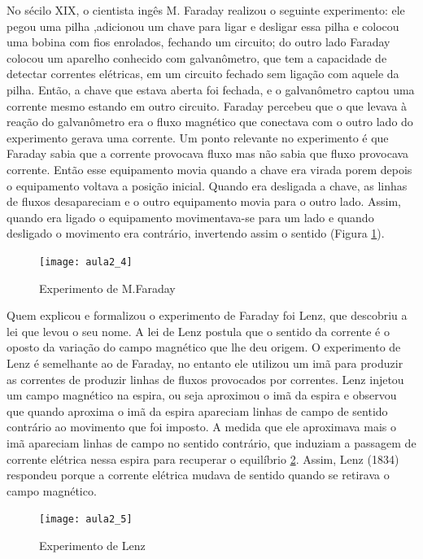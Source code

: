 No sécilo XIX, o cientista ingês M. Faraday realizou o seguinte experimento: ele pegou uma pilha ,adicionou um chave para ligar e desligar essa pilha e colocou uma bobina com fios enrolados, fechando um circuito; do outro lado Faraday colocou um aparelho conhecido com galvanômetro, que tem a capacidade de detectar correntes elétricas, em um circuito fechado sem ligação com aquele da pilha. Então, a chave que estava aberta foi fechada, e o galvanômetro captou uma corrente mesmo estando em outro circuito. Faraday percebeu que o que levava à reação do galvanômetro era o fluxo magnético que conectava com o outro lado do experimento gerava uma corrente. Um ponto relevante no experimento é que Faraday sabia que a corrente provocava fluxo mas não sabia que fluxo provocava corrente. Então esse equipamento movia quando a chave era virada porem depois o equipamento voltava a posição inicial. Quando era desligada a chave, as linhas de fluxos desapareciam e o outro equipamento movia para o outro lado. Assim, quando era ligado o equipamento movimentava-se para um lado e quando desligado o movimento era contrário, invertendo assim o sentido (Figura \ref{fig:aula2_4}). 
\begin{figure}[H]
\begin{centering}
\texttt{[image: aula2\_4]}\protect\caption{\label{fig:aula2_4}Experimento de M.Faraday }
\end{centering}

\end{figure}
Quem explicou e formalizou o experimento de Faraday foi Lenz, que descobriu a lei que levou o seu nome. A lei de Lenz postula que o sentido da corrente é o oposto da variação do campo magnético que lhe deu origem. O
experimento de Lenz é semelhante ao de Faraday, no entanto ele utilizou um imã para produzir as correntes de produzir linhas de fluxos provocados por correntes. Lenz injetou um campo magnético na espira, ou seja aproximou
o imã da espira e observou que quando aproxima o imã da espira
apareciam linhas de campo de sentido contrário ao movimento que foi
imposto. A medida que ele aproximava mais o imã apareciam linhas de campo no
sentido contrário, que induziam a passagem de corrente
elétrica nessa espira para recuperar o equilíbrio \ref{fig:aula2_5}. Assim,
Lenz (1834) respondeu porque a corrente elétrica mudava de sentido
quando se retirava o campo magnético.
\begin{figure}[H]
\begin{centering}
\texttt{[image: aula2\_5]}\protect\caption{\label{fig:aula2_5}Experimento de Lenz }
\end{centering}

\end{figure}

